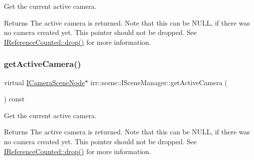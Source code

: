 Get the current active camera. 

\begin{DoxyReturn}{Returns}
The active camera is returned. Note that this can be N\+U\+LL, if there was no camera created yet. This pointer should not be dropped. See \hyperlink{classirr_1_1IReferenceCounted_a03856a09355b89d178090c4a5f738543}{I\+Reference\+Counted\+::drop()} for more information. 
\end{DoxyReturn}
\mbox{\label{classirr_1_1scene_1_1ISceneManager_a71391ee37dece0714d95c519f110010f}} 
\subsubsection{\texorpdfstring{get\+Active\+Camera()}{getActiveCamera()}\hspace{0.1cm}{\footnotesize\ttfamily [2/2]}}
{\footnotesize\ttfamily virtual \hyperlink{classirr_1_1scene_1_1ICameraSceneNode}{I\+Camera\+Scene\+Node}$\ast$ irr\+::scene\+::\+I\+Scene\+Manager\+::get\+Active\+Camera (\begin{DoxyParamCaption}{ }\end{DoxyParamCaption}) const\hspace{0.3cm}{\ttfamily [pure virtual]}}



Get the current active camera. 

\begin{DoxyReturn}{Returns}
The active camera is returned. Note that this can be N\+U\+LL, if there was no camera created yet. This pointer should not be dropped. See \hyperlink{classirr_1_1IReferenceCounted_a03856a09355b89d178090c4a5f738543}{I\+Reference\+Counted\+::drop()} for more information. 
\end{DoxyReturn}
\mbox{\label{classirr_1_1scene_1_1ISceneManager_adeb3d24c8ffafd5e671f344931a0b3a5}} 
